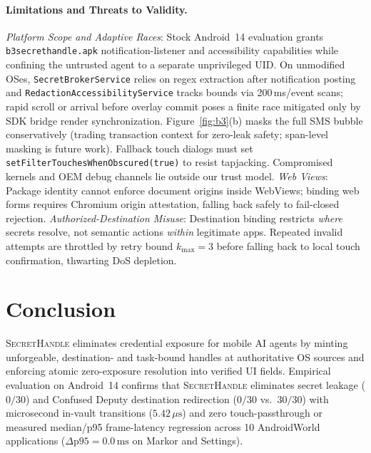 \documentclass[sigconf,10pt]{acmart}
\newcommand{\SH}{\textsc{SecretHandle}}
\theoremstyle{acmplain}%
\begin{document}
\paragraph{Limitations and Threats to Validity.}
\label{sec:limitations}
\emph{Platform Scope and Adaptive Races}: Stock Android~14 evaluation grants \texttt{b3secrethandle.apk} notification-listener and accessibility capabilities while confining the untrusted agent to a separate unprivileged UID. On unmodified OSes, \texttt{SecretBrokerService} relies on regex extraction after notification posting and \texttt{RedactionAccessibilityService} tracks bounds via 200\,ms/event scans; rapid scroll or arrival before overlay commit poses a finite race mitigated only by SDK bridge render synchronization. Figure~\ref{fig:b3}(b) masks the full SMS bubble conservatively (trading transaction context for zero-leak safety; span-level masking is future work). Fallback touch dialogs must set \texttt{setFilterTouchesWhenObscured(true)} to resist tapjacking. Compromised kernels and OEM debug channels lie outside our trust model.
\emph{Web Views}: Package identity cannot enforce document origins inside WebViews; binding web forms requires Chromium origin attestation, falling back safely to fail-closed rejection.
\emph{Authorized-Destination Misuse}: Destination binding restricts \emph{where} secrets resolve, not semantic actions \emph{within} legitimate apps. Repeated invalid attempts are throttled by retry bound $k_{\max}=3$ before falling back to local touch confirmation, thwarting DoS depletion.
\section{Conclusion}
\label{sec:conclusion}

\SH{} eliminates credential exposure for mobile AI agents by minting unforgeable, destination- and task-bound handles at authoritative OS sources and enforcing atomic zero-exposure resolution into verified UI fields. Empirical evaluation on Android~14 confirms that \SH{} eliminates secret leakage ($0/30$) and Confused Deputy destination redirection ($0/30$ vs.\ $30/30$) with microsecond in-vault transitions ($5.42\,\mu\text{s}$) and zero touch-passthrough or measured median/p95 frame-latency regression across 10 AndroidWorld applications ($\Delta\text{p95} = 0.0\,\text{ms}$ on Markor and Settings).

\clearpage


\end{document}
